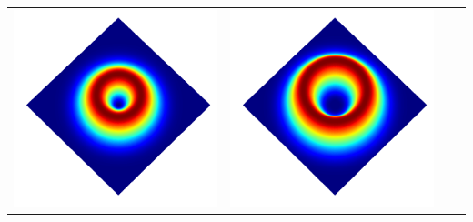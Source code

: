 \documentclass[a4paper, 12pt]{article}
\begin{document}
\begin{center}
\begin{tabular}{M{1.5cm}M{5cm}M{5cm}M{5cm}}
\includegraphics[width=\linewidth]{../resources/math_model/intensity_M=1.png} & 
\includegraphics[width=\linewidth]{../resources/math_model/intensity_M=2.png}\\
\end{tabular}
\end{center}
\end{document}
